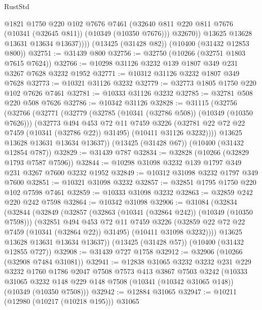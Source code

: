 \begin{lexlean}{RustStd}
\begin{coremodule}
{\begin{coremodule}
{{{{{{{{{{{{{{{{{{{{{{{{{                @1821
                @1750
                @220
                @102
                @7676
                @7461
                (@32640 @811 @220 @811 @7676 (@10341 (@32645 @811)) (@10349 (@10350 @7676)))
                @32670))
            @13625
            @13628
            @13631
            @13634
            @13637))))
    (@13425 (@31428 @82))
    (@10400 (@31432 @12853 @800))
@32751 := @31439 @800
@32756 := @32750 (@10266 (@32751 @1803 @7615 @7624))
@32766 := @10298 @31126 @3232 @139 @1807 @349 @231 @3267 @7628 @3232 @1952
@32771 := @10312 @31126 @3232 @1807 @349 @7628
@32773 := @10321 @31126 @3232
@32779 := @32773 @1805 @1750 @220 @102 @7626 @7461
@32781 := @10333 @31126 @3232
@32785 := @32781 @508 @220 @508 @7626
@32786 := @10342 @31126
@32828 := @31115
    (@32756
      (@32766
        (@32771
          (@32779
            (@32785 (@10341 (@32786 @508)) (@10349 (@10350 @7626)))
            (@32773
              @494
              @453
              @72
              @11
              @7459
              @3226
              (@32781 @22 @72 @22 @7459 (@10341 (@32786 @22)) @31495)
              (@10411 @31126 @3232))))
        @13625
        @13628
        @13631
        @13634
        @13637))
    (@13425 (@31428 @67))
    (@10400 (@31432 @12854 @787))
@32829 := @31439 @787
@32834 := @32828 (@10266 (@32829 @1793 @7587 @7596))
@32844 := @10298 @31098 @3232 @139 @1797 @349 @231 @3267 @7600 @3232 @1952
@32849 := @10312 @31098 @3232 @1797 @349 @7600
@32851 := @10321 @31098 @3232
@32857 := @32851 @1795 @1750 @220 @102 @7598 @7461
@32859 := @10333 @31098 @3232
@32863 := @32859 @242 @220 @242 @7598
@32864 := @10342 @31098
@32906 := @31084
    (@32834
      (@32844
        (@32849
          (@32857
            (@32863 (@10341 (@32864 @242)) (@10349 (@10350 @7598)))
            (@32851
              @494
              @453
              @72
              @11
              @7459
              @3226
              (@32859 @22 @72 @22 @7459 (@10341 (@32864 @22)) @31495)
              (@10411 @31098 @3232))))
        @13625
        @13628
        @13631
        @13634
        @13637))
    (@13425 (@31428 @57))
    (@10400 (@31432 @12855 @727))
@32908 := @31439 @727 @1758
@32912 := @32906 (@10266 (@32908 @7484 @31081))
@32941 := @12838
    @31065
    @3232
    @3232
    @231
    @229
    @3232
    @1760
    @1786
    @2047
    @7508
    @7573
    @413
    @3867
    @7503
    @3242
    (@10333 @31065 @3232 @148 @229 @148 @7508 (@10341 (@10342 @31065 @148)) (@10349 (@10350 @7508)))
@32942 := @12884 @31065
@32947 := @10211 (@12980 (@10217 (@10218 @195))) @31065
}}}}}}}}}}}}}}}}}}}}}}}}}
\end{coremodule}}
\end{coremodule}
\end{lexlean}
